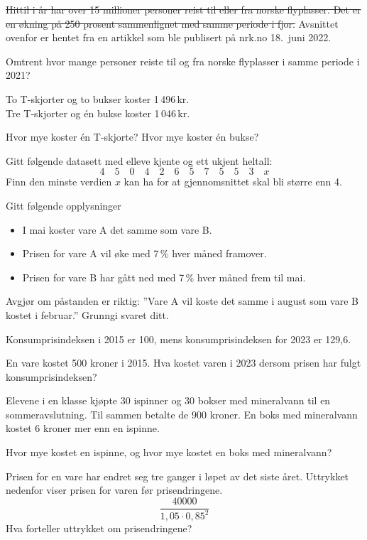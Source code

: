 \st{
Hittil i år har over 15 millioner personer reist til eller fra norske
flyplasser. Det er en økning på 250 prosent sammenlignet med samme periode
i fjor.
} 
Avsnittet ovenfor er hentet fra en artikkel som ble publisert på nrk.no
18.~juni 2022. \os

Omtrent hvor mange personer reiste til og fra norske flyplasser i samme
periode i 2021?

To T-skjorter og to bukser koster 1\,496\,kr.\\
Tre T-skjorter og én bukse koster 1\,046\,kr.\os

Hvor mye koster én T-skjorte? Hvor mye koster én bukse?

Gitt følgende datasett med elleve kjente og ett ukjent heltall:
\[ 4 \quad 5 \quad 0 \quad 4 \quad 2 \quad 6 \quad 5 \quad 7 \quad 5 \quad 5 \quad 3 \quad x \]
Finn den minste verdien $x$ kan ha for at gjennomsnittet skal bli større enn 4.

Gitt følgende opplysninger
\begin{itemize}
	\item I mai koster vare A det samme som vare B.
	\item Prisen for vare A vil øke med 7\,\% hver måned framover.
	\item Prisen for vare B har gått ned med 7\,\% hver måned frem til mai.
\end{itemize}
Avgjør om påstanden er riktig: ''Vare A vil koste det samme i august som vare B
kostet i februar.'' Grunngi svaret ditt.

Konsumprisindeksen i 2015 er 100, mens konsumprisindeksen for 2023 er 129,6. \os

En vare kostet 500 kroner i 2015. Hva kostet varen i 2023 dersom prisen har fulgt konsumprisindeksen?

Elevene i en klasse kjøpte 30 ispinner og 30 bokser med mineralvann til en
sommeravslutning. Til sammen betalte de 900 kroner. En boks med mineralvann
kostet 6 kroner mer enn en ispinne. \os

Hvor mye kostet en ispinne, og hvor mye kostet en boks med mineralvann?

Prisen for en vare har endret seg tre ganger i løpet av det siste året. Uttrykket
nedenfor viser prisen for varen før prisendringene.
\[ \frac{40000}{1,05\cdot0,85^2} \]
Hva forteller uttrykket om prisendringene?


